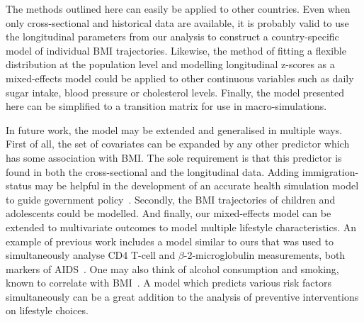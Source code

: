 \documentclass{imammb}
\numberwithin{equation}{section}
\begin{document}

The methods outlined here can easily be applied to other countries. Even when only cross-sectional and historical data are available, it is probably valid to use the longitudinal parameters from our analysis to construct a country-specific model of individual BMI trajectories. Likewise, the method of fitting a flexible distribution at the population level and modelling longitudinal z-scores as a mixed-effects model could be applied to other continuous variables such as daily sugar intake, blood pressure or cholesterol levels. Finally, the model presented here can be simplified to a transition matrix for use in macro-simulations.

In future work, the model may be extended and generalised in multiple ways. First of all, the set of covariates can be expanded by any other predictor which has some association with BMI. The sole requirement is that this predictor is found in both the cross-sectional and the longitudinal data. Adding immigration-status may be helpful in the development of an accurate health simulation model to guide government policy~\citep{TenDam2023}. Secondly, the BMI trajectories of children and adolescents could be modelled. And finally, our mixed-effects model can be extended to multivariate outcomes to model multiple lifestyle characteristics. An example of previous work includes a model similar to ours that was used to simultaneously analyse CD4 T-cell and $\beta$-2-microglobulin measurements, both markers of AIDS~\citep{Sy1997}. One may also think of alcohol consumption and smoking, known to correlate with BMI~\citep{Chiolero2008, Traversy2015}. A model which predicts various risk factors simultaneously can be a great addition to the analysis of preventive interventions on lifestyle choices.

\vspace*{6pt}

\nocite{*}


\end{document}
